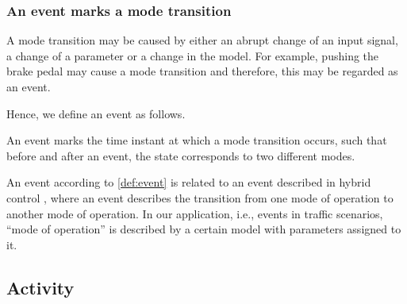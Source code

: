 \subsubsection{An event marks a mode transition}
A mode transition may be caused by either an abrupt change of an input signal, a change of a parameter or a change in the model. For example, pushing the brake pedal may cause a mode transition and therefore, this may be regarded as an event. 


Hence, we define an event as follows.
\begin{definition}[Event] \label{def:event}
	An event marks the time instant at which a mode transition occurs, such that before and after an event, the state corresponds to two different modes.
\end{definition}

An event according to \cref{def:event} is related to an event described in hybrid control \cite{deschutter2000optimal}, where an event describes the transition from one mode of operation to another mode of operation. In our application, i.e., events in traffic scenarios, ``mode of operation'' is described by a certain model with parameters assigned to it.




\subsection{Activity}
\label{sec:activity}

